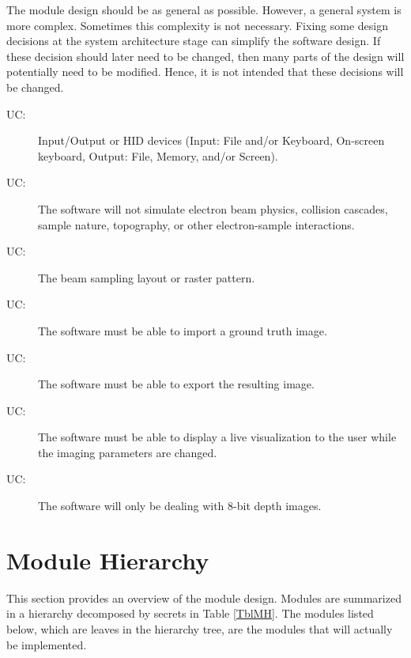 \documentclass[12pt, titlepage]{article}
\newcounter{ucnum}
\newcommand{\uctheucnum}{UC\theucnum}
\begin{document}
The module design should be as general as possible. However, a general system is
more complex. Sometimes this complexity is not necessary. Fixing some design
decisions at the system architecture stage can simplify the software design. If
these decision should later need to be changed, then many parts of the design
will potentially need to be modified. Hence, it is not intended that these
decisions will be changed.

\begin{description}
  \item[ \uctheucnum \label{UC_IO}:] Input/Output or HID devices
    (Input: File and/or Keyboard, On-screen keyboard, Output: File, Memory, and/or Screen).
  \item[ \uctheucnum \label{UC_physics}:] The software will not
    simulate electron beam physics, collision cascades, sample nature, topography, 
    or other electron-sample interactions.
  \item[ \uctheucnum \label{UC_layout}:] The beam sampling
    layout or raster pattern.
  \item[ \uctheucnum \label{UC_import}:] The software must
    be able to import a ground truth image.
  \item[ \uctheucnum \label{UC_export}:] The software must
    be able to export the resulting image.
  \item[ \uctheucnum \label{UC_visualize}:] The software must be able
    to display a live visualization to the user while the imaging parameters are changed.
  \item[ \uctheucnum \label{UC_8bit}:] The software will only be dealing
    with 8-bit depth images.
\end{description}

\section{Module Hierarchy} \label{SecMH}

This section provides an overview of the module design. Modules are summarized
in a hierarchy decomposed by secrets in Table \ref{TblMH}. The modules listed
below, which are leaves in the hierarchy tree, are the modules that will
actually be implemented.
\end{document}
